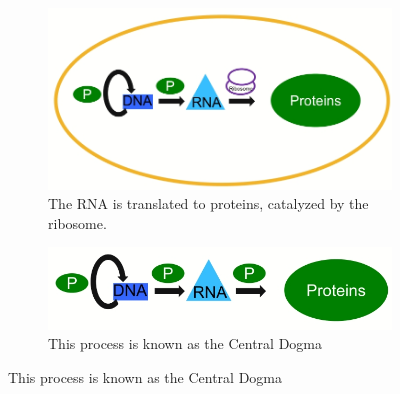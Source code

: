 \documentclass[]{article}
\begin{document}
\begin{figure}[H]
\begin{subfigure}[m]{0.45\textwidth}
	\end{subfigure}
	\begin{subfigure}[m]{0.45\textwidth}
		\caption{The RNA is translated to proteins, catalyzed by the ribosome.}\label{fig:ModernCellSchematic}
		\includegraphics[width=\textwidth]{ModernCellSchematic}
	\end{subfigure}
	\begin{center}
		\begin{subfigure}[m]{0.7\textwidth}
		\caption{This process is known as the Central Dogma}\label{fig:CentralDogmaModernCell}
		\includegraphics[width=\textwidth]{CentralDogmaModernCell}
	\end{subfigure}
	\end{center}
\end{figure}
\end{document}
